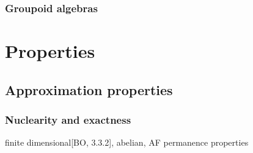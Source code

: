 \documentclass{../../large}
\begin{document}
\section{Groupoid algebras}









\part{Properties}
\chapter{Approximation properties}
\section{Nuclearity and exactness}

finite dimensional[BO, 3.3.2], abelian, AF
permanence properties
\end{document}
